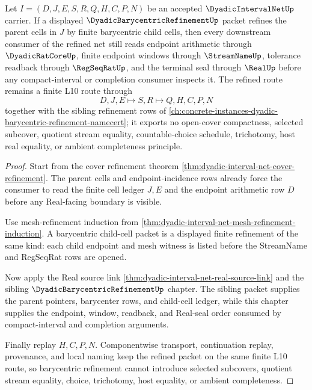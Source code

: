\begin{theorem}\label{thm:dyadic-interval-net-barycentric-refinement-consumer}
Let $I=(D,J,E,S,R,Q,H,C,P,N)$ be an accepted $\DyadicIntervalNetUp$ carrier. If a displayed $\DyadicBarycentricRefinementUp$ packet refines the parent cells in $J$ by finite barycentric child cells, then every downstream consumer of the refined net still reads endpoint arithmetic through $\DyadicRatCoreUp$, finite endpoint windows through $\StreamNameUp$, tolerance readback through $\RegSeqRatUp$, and the terminal seal through $\RealUp$ before any compact-interval or completion consumer inspects it. The refined route remains a finite L10 route through
$$
D,J,E \longmapsto S,R \longmapsto Q,H,C,P,N
$$
together with the sibling refinement rows of \autoref{ch:concrete-instances-dyadic-barycentric-refinement-namecert}; it exports no open-cover compactness, selected subcover, quotient stream equality, countable-choice schedule, trichotomy, host real equality, or ambient completeness principle.
\end{theorem}
\begin{proof}
Start from the cover refinement theorem \autoref{thm:dyadic-interval-net-cover-refinement}. The parent cells and endpoint-incidence rows already force the consumer to read the finite cell ledger $J,E$ and the endpoint arithmetic row $D$ before any Real-facing boundary is visible.

Use mesh-refinement induction from \autoref{thm:dyadic-interval-net-mesh-refinement-induction}. A barycentric child-cell packet is a displayed finite refinement of the same kind: each child endpoint and mesh witness is listed before the StreamName and RegSeqRat rows are opened.

Now apply the Real source link \autoref{thm:dyadic-interval-net-real-source-link} and the sibling $\DyadicBarycentricRefinementUp$ chapter. The sibling packet supplies the parent pointers, barycenter rows, and child-cell ledger, while this chapter supplies the endpoint, window, readback, and Real-seal order consumed by compact-interval and completion arguments.

Finally replay $H,C,P,N$. Componentwise transport, continuation replay, provenance, and local naming keep the refined packet on the same finite L10 route, so barycentric refinement cannot introduce selected subcovers, quotient stream equality, choice, trichotomy, host equality, or ambient completeness.
\end{proof}

